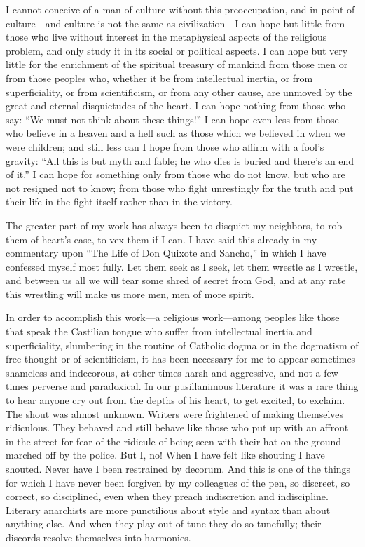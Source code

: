 I cannot conceive of a man of culture without this preoccupation, and
in point of culture---and culture is not the same as civilization---I
can hope but little from those who live without interest in the
metaphysical aspects of the religious problem, and only study it in
its social or political aspects. I can hope but very little for the
enrichment of the spiritual treasury of mankind from those men or from
those peoples who, whether it be from intellectual inertia, or from
superficiality, or from scientificism, or from any other cause, are
unmoved by the great and eternal disquietudes of the heart. I can hope
nothing from those who say: ``We must not think about these things!''
I can hope even less from those who believe in a heaven and a hell
 such as those which we believed in when we were children;
and still less can I hope from those who affirm with a fool's gravity:
``All this is but myth and fable; he who dies is buried and there's an
end of it.'' I can hope for something only from those who do not know,
but who are not resigned not to know; from those who fight unrestingly
for the truth and put their life in the fight itself rather than in
the victory.

The greater part of my work has always been to disquiet my neighbors,
to rob them of heart's ease, to vex them if I can. I have said this
already in my commentary upon ``The Life of Don Quixote and Sancho,''
in which I have confessed myself most fully. Let them seek as I seek,
let them wrestle as I wrestle, and between us all we will tear some
shred of secret from God, and at any rate this wrestling will make us
more men, men of more spirit.

In order to accomplish this work---a religious work---among peoples
like those that speak the Castilian tongue who suffer from
intellectual inertia and superficiality, slumbering in the routine of
Catholic dogma or in the dogmatism of free-thought or of
scientificism, it has been necessary for me to appear sometimes
shameless and indecorous, at other times harsh and aggressive, and not
a few times perverse and paradoxical. In our pusillanimous literature
it was a rare thing to hear anyone cry out from the depths of his
heart, to get excited, to exclaim. The shout was almost unknown.
Writers were frightened of making themselves ridiculous. They behaved
and still behave like those who put up with an affront in the street
for fear of the ridicule of being seen with their hat on the
 ground marched off by the police. But I, no! When I have
felt like shouting I have shouted. Never have I been restrained by
decorum. And this is one of the things for which I have never been
forgiven by my colleagues of the pen, so discreet, so correct, so
disciplined, even when they preach indiscretion and indiscipline.
Literary anarchists are more punctilious about style and syntax than
about anything else. And when they play out of tune they do so
tunefully; their discords resolve themselves into harmonies.

